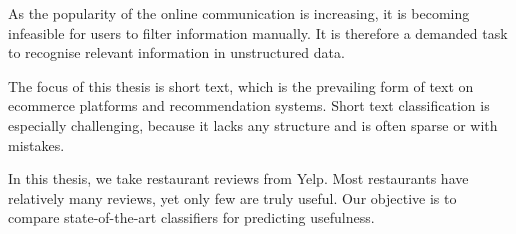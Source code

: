 \documentclass[12pt]{report}
\begin{document}

As the popularity of the online communication is increasing,
it is becoming infeasible for users to filter information manually.
It is therefore a demanded task to recognise relevant information in unstructured data.

The focus of this thesis is short text,
which is the prevailing form of text on ecommerce platforms and recommendation systems.
Short text classification is especially challenging, because it lacks any structure
and is often sparse or with mistakes.

In this thesis, we take restaurant reviews from Yelp.
Most restaurants have relatively many reviews, yet only few are truly useful.
Our objective is to compare state-of-the-art classifiers for predicting usefulness.
\end{document}
